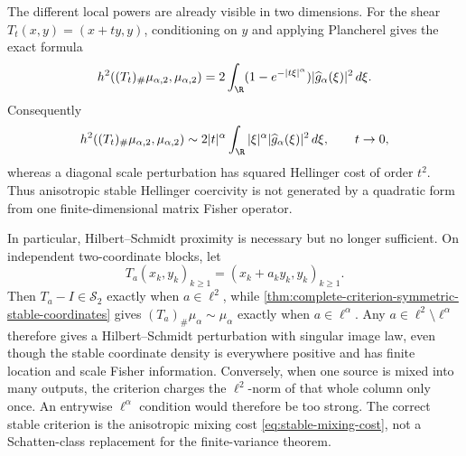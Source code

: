 The different local powers are already visible in two dimensions.
For the shear \(T_t(x,y)=(x+ty,y)\), conditioning on \(y\) and applying
Plancherel gives the exact formula
\begin{equation}
 h^2((T_t)_\#\mu_{\alpha,2},\mu_{\alpha,2})
 =2\int_\R(1-e^{-|t\xi|^\alpha})
                  |\widehat g_\alpha(\xi)|^2\,d\xi.
 \label{eq:stable-shear-hellinger-formula}
\end{equation}
Consequently
\[
 h^2((T_t)_\#\mu_{\alpha,2},\mu_{\alpha,2})
 \sim2|t|^\alpha\int_\R|\xi|^\alpha
                         |\widehat g_\alpha(\xi)|^2\,d\xi,
 \qquad t\to0,
\]
whereas a diagonal scale perturbation has squared Hellinger cost of order
\(t^2\).
Thus anisotropic stable Hellinger coercivity is not generated by a quadratic
form from one finite-dimensional matrix Fisher operator.

In particular, Hilbert--Schmidt proximity is necessary but no longer
sufficient.
On independent two-coordinate blocks, let
\[
 T_a(x_k,y_k)_{k\ge1}=(x_k+a_ky_k,y_k)_{k\ge1}.
\]
Then \(T_a-I\in\mathcal S_2\) exactly when \(a\in\ell^2\), while
\cref{thm:complete-criterion-symmetric-stable-coordinates} gives
\((T_a)_\#\mu_\alpha\sim\mu_\alpha\) exactly when
\(a\in\ell^\alpha\).
Any \(a\in\ell^2\setminus\ell^\alpha\) therefore gives a
Hilbert--Schmidt perturbation with singular image law, even though the
stable coordinate density is everywhere positive and has finite location
and scale Fisher information.
Conversely, when one source is mixed into many outputs, the criterion
charges the \(\ell^2\)-norm of that whole column only once.
An entrywise \(\ell^\alpha\) condition would therefore be too strong.
The correct stable criterion is the anisotropic mixing cost
\eqref{eq:stable-mixing-cost}, not a Schatten-class replacement for the
finite-variance theorem.
